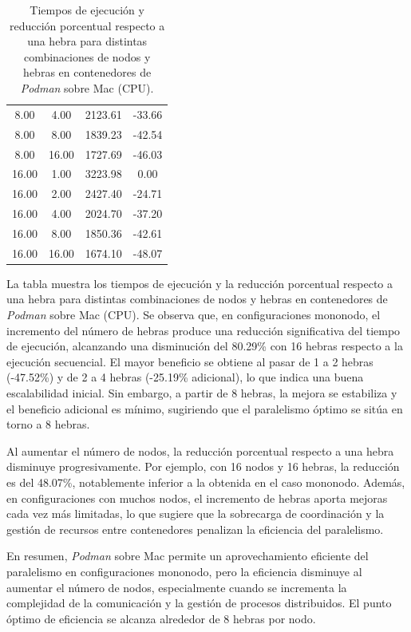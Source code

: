 \begin{table}[ht]
\begin{tabular}{|c|c|c|c|}
        8.00           & 4.00            & 2123.61             & -33.66                         \\
        8.00           & 8.00            & 1839.23             & -42.54                         \\
        8.00           & 16.00           & 1727.69             & -46.03                         \\
        16.00          & 1.00            & 3223.98             & 0.00                           \\
        16.00          & 2.00            & 2427.40             & -24.71                         \\
        16.00          & 4.00            & 2024.70             & -37.20                         \\
        16.00          & 8.00            & 1850.36             & -42.61                         \\
        16.00          & 16.00           & 1674.10             & -48.07                         \\
        \hline
    \end{tabular}
    \caption{Tiempos de ejecución y reducción porcentual respecto a una hebra para distintas combinaciones de nodos y hebras en contenedores de \textit{Podman} sobre Mac (CPU).}
    \label{tab:thread_sweep_mac_\textit{Podman}_time}
\end{table}

La tabla muestra los tiempos de ejecución y la reducción porcentual respecto a una hebra para distintas combinaciones de nodos y hebras en contenedores de \textit{Podman} sobre Mac (CPU). Se observa que, en configuraciones mononodo, el incremento del número de hebras produce una reducción significativa del tiempo de ejecución, alcanzando una disminución del 80.29\% con 16 hebras respecto a la ejecución secuencial. El mayor beneficio se obtiene al pasar de 1 a 2 hebras (-47.52\%) y de 2 a 4 hebras (-25.19\% adicional), lo que indica una buena escalabilidad inicial. Sin embargo, a partir de 8 hebras, la mejora se estabiliza y el beneficio adicional es mínimo, sugiriendo que el paralelismo óptimo se sitúa en torno a 8 hebras.

Al aumentar el número de nodos, la reducción porcentual respecto a una hebra disminuye progresivamente. Por ejemplo, con 16 nodos y 16 hebras, la reducción es del 48.07\%, notablemente inferior a la obtenida en el caso mononodo. Además, en configuraciones con muchos nodos, el incremento de hebras aporta mejoras cada vez más limitadas, lo que sugiere que la sobrecarga de coordinación y la gestión de recursos entre contenedores penalizan la eficiencia del paralelismo.

En resumen, \textit{Podman} sobre Mac permite un aprovechamiento eficiente del paralelismo en configuraciones mononodo, pero la eficiencia disminuye al aumentar el número de nodos, especialmente cuando se incrementa la complejidad de la comunicación y la gestión de procesos distribuidos. El punto óptimo de eficiencia se alcanza alrededor de 8 hebras por nodo.
